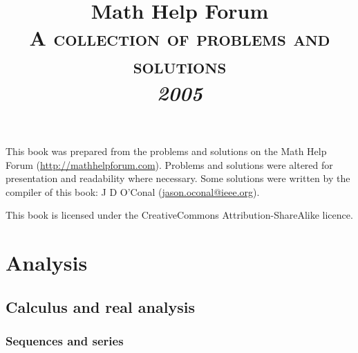 \documentclass[a4paper]{book}
\makeatletter
\renewcommand\tableofcontents{%
    \if@twocolumn
      \@restonecoltrue\onecolumn
    \else
      \@restonecolfalse
    \fi
    \chapter*{\contentsname}%
        \@mkboth{%
           \MakeUppercase\contentsname}{\MakeUppercase\contentsname}%
    \@starttoc{toc}%
    \if@restonecol\twocolumn\fi
    }
\makeatother
\begin{document}
	\title{Math Help Forum\\\vspace{12pt}\Large\textsc{A collection of problems and solutions}\vspace{24pt}\\\vspace{24pt}\Huge\textit{2005}}
	\author{}
	\date{}

	\maketitle

	This book was prepared from the problems and solutions on the Math Help Forum (\url{http://mathhelpforum.com}). Problems and solutions were altered for presentation and readability where necessary. Some solutions were written by the compiler of this book: J D O'Conal (\url{jason.oconal@ieee.org}).

	This book is licensed under the CreativeCommons Attribution-ShareAlike licence.

	\begin{center}\Huge\bysa\normalsize\end{center}

    \tableofcontents




	\part{Analysis}

    \chapter{Calculus and real analysis}

    \section{Sequences and series}
\end{document}
